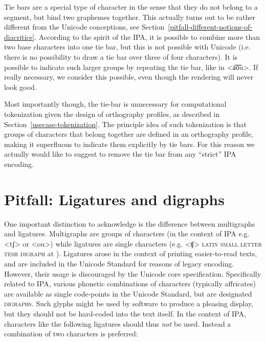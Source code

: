 Tie bars are a special type of character in the sense that they do not belong to
a segment, but bind two graphemes together. This actually turns out to be rather
different from the Unicode conceptions, see
Section~\ref{pitfall-different-notions-of-diacritics}. According to the spirit
of the IPA, it is possible to combine more than two base characters into one tie
bar, but this is not possible with Unicode (i.e. there is no possibility to draw
a tie bar over three of four characters). It is possible to indicate such larger
groups by repeating the tie bar, like in <a͡o͡u>. If really necessary, we
consider this possible, even though the rendering will never look good. 

Most importantly though, the tie-bar is unnecessary for computational
tokenization given the design of orthography profiles, as described in
Section~\ref{usecase-tokenization}. The principle idea of such tokenization is 
that groups of characters that belong together are defined in an orthography 
profile, making it superfluous to indicate them explicitly by tie bars. For this 
reason we actually would like to suggest to remove the tie bar from any 
``strict'' IPA encoding.

\section{Pitfall: Ligatures and digraphs}
\label{pitfall-ligatures-digraphs}     

One important distinction to acknowledge is the difference between multigraphs
and ligatures. Multigraphs are groups of characters (in the context of IPA e.g.
<tʃ> or <ou>) while ligatures are single characters (e.g. <ʧ> \textsc{latin
small letter tesh digraph} at ). Ligatures arose in the context of
printing easier-to-read texts, and are included in the Unicode Standard for
reasons of legacy encoding. However, their usage is discouraged by the Unicode
core specification. Specifically related to IPA, various phonetic combinations
of characters (typically affricates) are available as single code-points in the
Unicode Standard, but are designated \textsc{digraphs}. Such glyphs might be used by
software to produce a pleasing display, but they should not be hard-coded into
the text itself. In the context of IPA, characters like the following ligatures
should thus \emph{not} be used. Instead a combination of two characters is
preferred:
      
